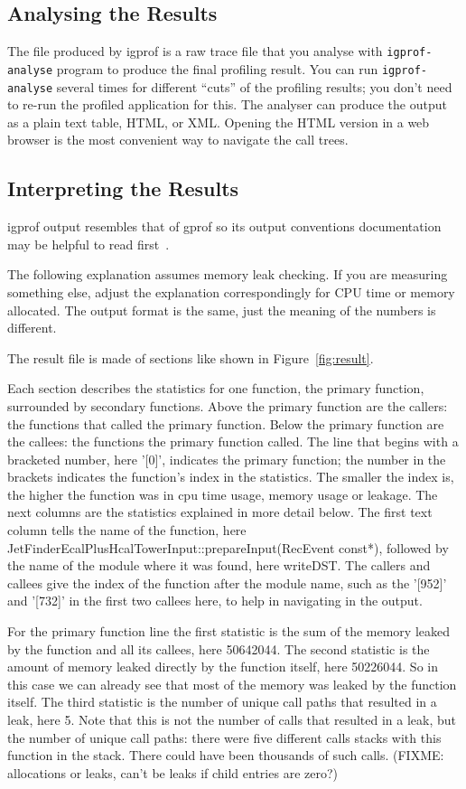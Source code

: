 \documentclass[10pt,a4paper,twocolumn]{article}
\begin{document}
\subsection{Analysing the Results}

The file produced by igprof is a raw trace file that you analyse with
\verb|igprof-analyse| program to produce the final profiling result.
You can run \verb|igprof-analyse| several times for different ``cuts''
of the profiling results; you don't need to re-run the profiled
application for this.  The analyser can produce the output as a plain
text table, HTML, or XML.  Opening the HTML version in a web browser
is the most convenient way to navigate the call trees.

\subsection{Interpreting the Results}

igprof output resembles that of gprof so its output conventions
documentation may be helpful to read first~\cite{gprofresult}.

The following explanation assumes memory leak checking.  If you are
measuring something else, adjust the explanation correspondingly for
CPU time or memory allocated. The output format is the same, just the
meaning of the numbers is different.

The result file is made of sections like shown in Figure~\ref{fig:result}.

Each section describes the statistics for one function, the primary
function, surrounded by secondary functions.  Above the primary
function are the callers: the functions that called the primary
function.  Below the primary function are the callees: the functions
the primary function called. The line that begins with a bracketed
number, here '[0]', indicates the primary function; the number in the
brackets indicates the function's index in the statistics.  The
smaller the index is, the higher the function was in cpu time usage,
memory usage or leakage.  The next columns are the statistics
explained in more detail below. The first text column tells the name
of the function, here
JetFinderEcalPlusHcalTowerInput::prepareInput(RecEvent const*),
followed by the name of the module where it was found, here
writeDST.  The callers and callees give the index of the function after
the module name, such as the '[952]' and '[732]' in the first two
callees here, to help in navigating in the output.

For the primary function line the first statistic is the sum of the
memory leaked by the function and all its callees, here 50642044.  The
second statistic is the amount of memory leaked directly by the
function itself, here 50226044.  So in this case we can already see
that most of the memory was leaked by the function itself. The third
statistic is the number of unique call paths that resulted in a leak,
here 5. Note that this is not the number of calls that resulted in a
leak, but the number of unique call paths: there were five different
calls stacks with this function in the stack. There could have been
thousands of such calls. (FIXME: allocations or leaks, can't be leaks
if child entries are zero?)
\end{document}
